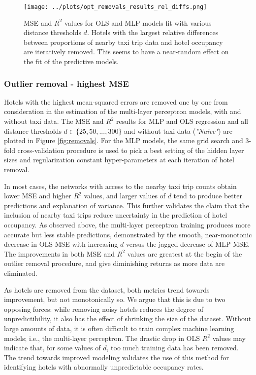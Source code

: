 \documentclass[useAMS, referee, usenatbib]{biom}
\begin{document}
\begin{figure}
	\centering
    \captionsetup{justification=centering}
	\texttt{[image: ../plots/opt\_removals\_results\_rel\_diffs.png]}
	\caption{MSE and $R^2$ values for OLS and MLP models fit with various distance thresholds $d$. Hotels with the largest relative differences between proportions of nearby taxi trip data and hotel occupancy are iteratively removed. This seems to have a near-random effect on the fit of the predictive models.}
	\label{fig:rel_diffs_removals}
\end{figure}

\subsubsection{Outlier removal - highest MSE}
\label{ss:outlier_mse}

Hotels with the highest mean-squared errors are removed one by one from consideration in the estimation of the multi-layer perceptron models, with and without taxi data. The MSE and $R^2$ results for MLP and OLS regression and all distance thresholds $d \in \{25, 50, ..., 300 \}$ and without taxi data (\textit{"Naive"}) are plotted in Figure \ref{fig:removals}. For the MLP models, the same grid search and 3-fold cross-validation procedure is used to pick a best setting of the hidden layer sizes and regularization constant hyper-parameters at each iteration of hotel removal.

In most cases, the networks with access to the nearby taxi trip counts obtain lower MSE and higher $R^2$ values, and larger values of $d$ tend to produce better predictions and explanation of variance. This further validates the claim that the inclusion of nearby taxi trips reduce uncertainty in the prediction of hotel occupancy. As observed above, the multi-layer perceptron training produces more accurate but less stable predictions, demonstrated by the smooth, near-monotonic decrease in OLS MSE with increasing $d$ versus the jagged decrease of MLP MSE. The improvements in both MSE and $R^2$ values are greatest at the begin of the outlier removal procedure, and give diminishing returns as more data are eliminated.

As hotels are removed from the dataset, both metrics trend towards improvement, but not monotonically so. We argue that this is due to two opposing forces: while removing noisy hotels reduces the degree of unpredictibility, it also has the effect of shrinking the size of the dataset. Without large amounts of data, it is often difficult to train complex machine learning models; i.e., the multi-layer perceptron. The drastic drop in OLS $R^2$ values may indicate that, for some values of $d$, too much training data has been removed. The trend towards improved modeling validates the use of this method for identifying hotels with abnormally unpredictable occupancy rates.
\end{document}
